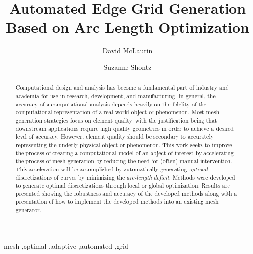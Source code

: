 \documentclass[preprint,12pt]{elsarticle}
\begin{document}
\begin{frontmatter}



\title{Automated Edge Grid Generation Based on Arc Length Optimization}


\author[David]{David McLaurin}
\author[Suzanne]{Suzanne Shontz}
\address[David]{Mississippi State Univesity, Starkville, MS}
\address[Suzanne]{Mississippi State Univesity, Starkville, MS}

\begin{abstract}
Computational design and analysis has become a fundamental part of industry and academia for use in research, development, and manufacturing. In general, the accuracy of a computational analysis depends heavily on the fidelity of the computational representation of a real-world object or phenomenon. Most mesh generation strategies focus on element quality--with the justification being that downstream applications require high quality geometries in order to achieve a desired level of accuracy. However, element quality should be secondary to accurately representing the underly physical object or phenomenon. This work seeks to improve the process of creating a computational model of an object of interest by accelerating the process of mesh generation by reducing the need for (often) manual intervention. This acceleration will be accomplished by automatically generating \textit{optimal} discretizations of curves by minimizing the \textit{arc-length deficit}. Methods were developed to generate optimal discretizations through local or global optimization. Results are presented showing the robustness and accuracy of the developed methods along with a presentation of how to implement the developed methods into an existing mesh generator.
\end{abstract}

\begin{keyword}

mesh \sep optimal \sep adaptive \sep automated \sep grid
\end{keyword}

\end{frontmatter}
\end{document}
